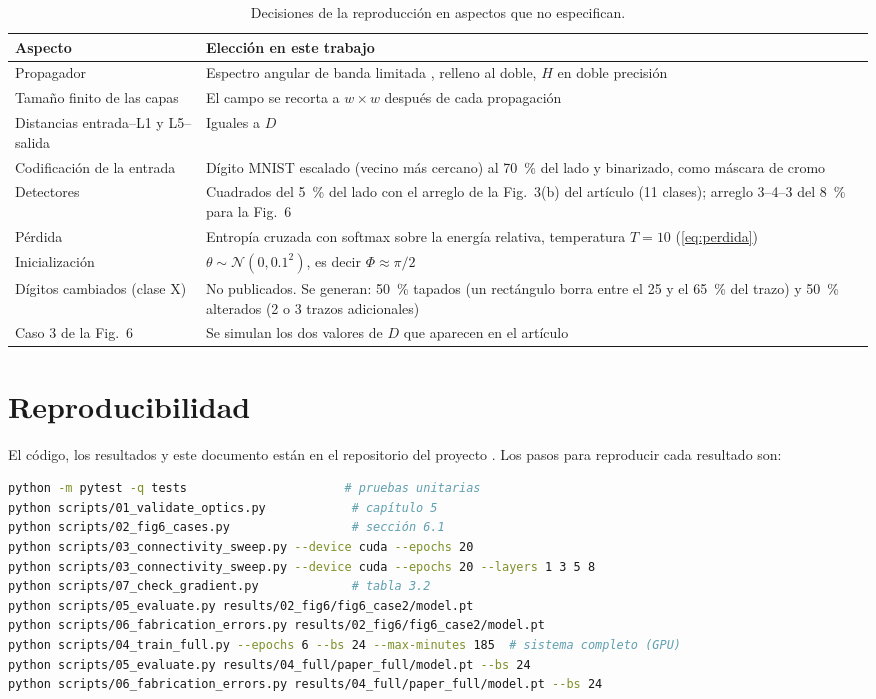 \begin{table}[!htbp]
\centering
\caption{Decisiones de la reproducción en aspectos que \textcite{chen2021} no especifican.}
\label{tab:decisiones}
\begin{tabularx}{\textwidth}{@{}>{\raggedright}p{4.2cm}X@{}}
\toprule
Aspecto & Elección en este trabajo\\
\midrule
Propagador & Espectro angular de banda limitada \parencite{matsushima2009}, relleno al doble, $H$ en doble precisión\\
Tamaño finito de las capas & El campo se recorta a $w\times w$ después de cada propagación\\
Distancias entrada--L1 y L5--salida & Iguales a $D$\\
Codificación de la entrada & Dígito MNIST escalado (vecino más cercano) al \SI{70}{\percent} del lado y binarizado, como máscara de cromo\\
Detectores & Cuadrados del \SI{5}{\percent} del lado con el arreglo de la Fig.~3(b) del artículo (11 clases); arreglo 3--4--3 del \SI{8}{\percent} para la Fig.~6\\
Pérdida & Entropía cruzada con softmax sobre la energía relativa, temperatura $T=10$ (\cref{eq:perdida})\\
Inicialización & $\theta\sim\mathcal N(0,0.1^2)$, es decir $\Phi\approx\pi/2$\\
Dígitos cambiados (clase X) & No publicados. Se generan: \SI{50}{\percent} tapados (un rectángulo borra entre el 25 y el \SI{65}{\percent} del trazo) y \SI{50}{\percent} alterados (2 o 3 trazos adicionales)\\
Caso 3 de la Fig.~6 & Se simulan los dos valores de $D$ que aparecen en el artículo\\
\bottomrule
\end{tabularx}
\end{table}

\FloatBarrier
\section{Reproducibilidad}

El código, los resultados y este documento están en el repositorio del proyecto
\parencite{repo2026}. Los pasos para reproducir cada resultado son:
\begin{lstlisting}[language=bash,numbers=none,basicstyle=\ttfamily\scriptsize]
python -m pytest -q tests                      # pruebas unitarias
python scripts/01_validate_optics.py            # capítulo 5
python scripts/02_fig6_cases.py                 # sección 6.1
python scripts/03_connectivity_sweep.py --device cuda --epochs 20
python scripts/03_connectivity_sweep.py --device cuda --epochs 20 --layers 1 3 5 8
python scripts/07_check_gradient.py             # tabla 3.2
python scripts/05_evaluate.py results/02_fig6/fig6_case2/model.pt
python scripts/06_fabrication_errors.py results/02_fig6/fig6_case2/model.pt
python scripts/04_train_full.py --epochs 6 --bs 24 --max-minutes 185  # sistema completo (GPU)
python scripts/05_evaluate.py results/04_full/paper_full/model.pt --bs 24
python scripts/06_fabrication_errors.py results/04_full/paper_full/model.pt --bs 24
\end{lstlisting}

